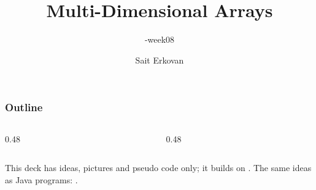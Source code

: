 \documentclass[aspectratio=169,10pt,compress]{beamer}
\title[\cisOOO-week08-Arrays ND]{
	Multi-Dimensional Arrays
}
\subtitle{
	\cisOOO-week08
}
\author[Erkovan]{Sait Erkovan}
\institute[FCIS]{
	Faculty of Computer and Information Sciences\\
	Yeditepe University
}
\date{{\tiny \hbTimeStamp}}
\begin{document}




\begin{frame}[t,fragile]
	\titlepage
\end{frame}




\begin{frame}[t,fragile] \frametitle{Outline}
	\begin{columns}[T]
		\begin{column}{0.48\textwidth}
			\tableofcontents[sections={1-4}, hideallsubsections]
		\end{column}
		\begin{column}{0.48\textwidth}
			\tableofcontents[sections={5-7}, hideallsubsections]
		\end{column}
	\end{columns}

	\vspace{1em}
	\small This deck has ideas, pictures and pseudo code only; 
	it builds on .
	The same ideas as Java programs: .
\end{frame}




\end{document}
